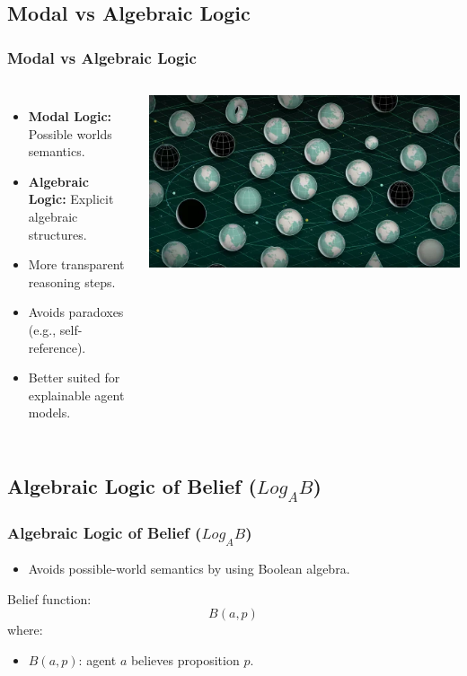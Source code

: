 \documentclass[aspectratio=169]{beamer}
\begin{document}
\subsection{Modal vs Algebraic Logic}
\begin{frame}
\frametitle{Modal vs Algebraic Logic}

\begin{columns}[c]


\Large
\begin{itemize}
    \item \textbf{Modal Logic:} Possible worlds semantics.
    \item \textbf{Algebraic Logic:} Explicit algebraic structures.
    \item More transparent reasoning steps.
    \item Avoids paradoxes (e.g., self-reference).
    \item Better suited for explainable agent models.
\end{itemize}


\centering
\includegraphics[width=\linewidth]{images/worlds.png}

\end{columns}

\end{frame}

\subsection{Algebraic Logic of Belief ($Log_AB$)}
\begin{frame}
\frametitle{Algebraic Logic of Belief ($Log_AB$)}
\Large
\begin{itemize}
    \item Avoids possible-world semantics by using Boolean algebra.
\end{itemize}
\begin{block}{Belief function:}
\[
B(a, p)
\]
\normalsize where:
\begin{itemize}
    \item $B(a, p)$: agent $a$ believes proposition $p$.
\end{itemize}
\end{block}
\end{frame}
\end{document}
